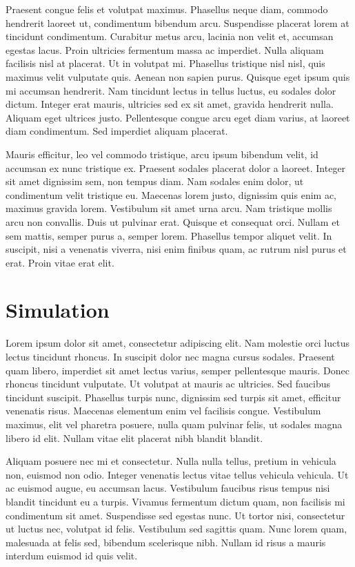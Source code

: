 \documentclass[11pt,twoside,a4paper]{article}
\begin{document}
	Praesent congue felis et volutpat maximus. Phasellus neque diam, commodo hendrerit laoreet ut, condimentum bibendum arcu. Suspendisse placerat lorem at tincidunt condimentum. Curabitur metus arcu, lacinia non velit et, accumsan egestas lacus. Proin ultricies fermentum massa ac imperdiet. Nulla aliquam facilisis nisl at placerat. Ut in volutpat mi. Phasellus tristique nisl nisl, quis maximus velit vulputate quis. Aenean non sapien purus. Quisque eget ipsum quis mi accumsan hendrerit. Nam tincidunt lectus in tellus luctus, eu sodales dolor dictum. Integer erat mauris, ultricies sed ex sit amet, gravida hendrerit nulla. Aliquam eget ultrices justo. Pellentesque congue arcu eget diam varius, at laoreet diam condimentum. Sed imperdiet aliquam placerat.
	
	Mauris efficitur, leo vel commodo tristique, arcu ipsum bibendum velit, id accumsan ex nunc tristique ex. Praesent sodales placerat dolor a laoreet. Integer sit amet dignissim sem, non tempus diam. Nam sodales enim dolor, ut condimentum velit tristique eu. Maecenas lorem justo, dignissim quis enim ac, maximus gravida lorem. Vestibulum sit amet urna arcu. Nam tristique mollis arcu non convallis. Duis ut pulvinar erat. Quisque et consequat orci. Nullam et sem mattis, semper purus a, semper lorem. Phasellus tempor aliquet velit. In suscipit, nisi a venenatis viverra, nisi enim finibus quam, ac rutrum nisl purus et erat. Proin vitae erat elit.
	
	\section{Simulation}
	Lorem ipsum dolor sit amet, consectetur adipiscing elit. Nam molestie orci luctus lectus tincidunt rhoncus. In suscipit dolor nec magna cursus sodales. Praesent quam libero, imperdiet sit amet lectus varius, semper pellentesque mauris. Donec rhoncus tincidunt vulputate. Ut volutpat at mauris ac ultricies. Sed faucibus tincidunt suscipit. Phasellus turpis nunc, dignissim sed turpis sit amet, efficitur venenatis risus. Maecenas elementum enim vel facilisis congue. Vestibulum maximus, elit vel pharetra posuere, nulla quam pulvinar felis, ut sodales magna libero id elit. Nullam vitae elit placerat nibh blandit blandit.
	
	Aliquam posuere nec mi et consectetur. Nulla nulla tellus, pretium in vehicula non, euismod non odio. Integer venenatis lectus vitae tellus vehicula vehicula. Ut ac euismod augue, eu accumsan lacus. Vestibulum faucibus risus tempus nisi blandit tincidunt eu a turpis. Vivamus fermentum dictum quam, non facilisis mi condimentum sit amet. Suspendisse sed egestas nunc. Ut tortor nisi, consectetur ut luctus nec, volutpat id felis. Vestibulum sed sagittis quam. Nunc lorem quam, malesuada at felis sed, bibendum scelerisque nibh. Nullam id risus a mauris interdum euismod id quis velit.
	
\end{document}
